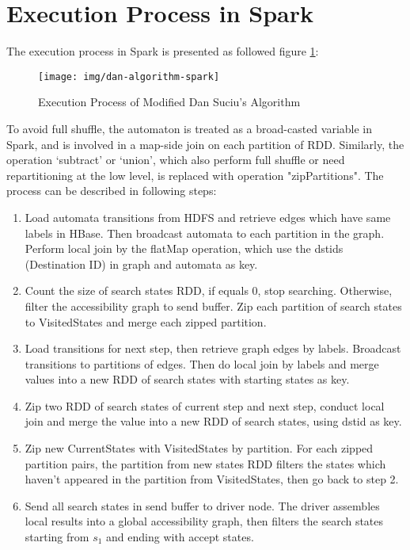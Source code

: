 \section{Execution Process in Spark}
The execution process in Spark is presented as followed figure \ref{fig:dan-algorithm-spark}:
\begin{figure}[h!]
  \caption{Execution Process of Modified Dan Suciu's Algorithm}
  \label{fig:dan-algorithm-spark}
  \centering
    \texttt{[image: img/dan-algorithm-spark]}
\end{figure}
To avoid full shuffle, the automaton is treated as a broad-casted variable in Spark, and is involved in a map-side join on each partition of RDD. Similarly, the operation `subtract' or `union', which also perform full shuffle or need repartitioning at the low level, is replaced with operation "zipPartitions".
The process can be described in following steps: 
\begin{enumerate}
    \item Load automata transitions from HDFS and retrieve edges which have same labels in HBase. Then broadcast automata to each partition in the graph. Perform local join by the flatMap operation, which use the dstids (Destination ID) in graph and automata as key.
    \item Count the size of search states RDD, if equals 0, stop searching. Otherwise, filter the accessibility graph to send buffer. Zip each partition of search states to VisitedStates and merge each zipped partition.
    \item Load transitions for next step, then retrieve graph edges by labels. Broadcast transitions to partitions of edges. Then do local join by labels and merge values into a new RDD of search states with starting states as key.
    \item Zip two RDD of search states of current step and next step, conduct local join and merge the value into a new RDD of search states, using dstid as key.
    \item Zip new CurrentStates with VisitedStates by partition. For each zipped partition pairs, the partition from new states RDD filters the states which haven't appeared in the partition from VisitedStates, then go back to step 2.
    \item Send all search states in send buffer to driver node. The driver assembles local results into a global accessibility graph, then filters the search states starting from $s_1$ and ending with accept states.
\end{enumerate}
